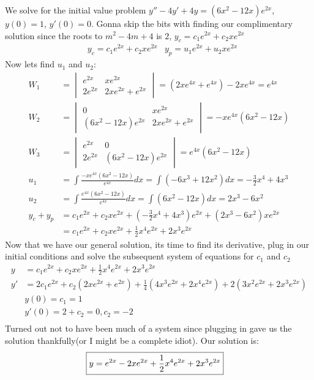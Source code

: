 \documentclass{article}
\begin{document}
\subsubsection{}
We solve for the initial value problem $y'' - 4y' + 4y = (6x^2 - 12x)e^{2x}$, $y(0) = 1$, $y'(0) = 0$.
Gonna skip the bits with finding our complimentary solution since the roots to $m^2 - 4m + 4$ is $ 2 $, $y_c =
c_1e^{2x} + c_2xe^{2x} $
\begin{align*}
    & y_c = c_1e^{2x} + c_2xe^{2x}
    & y_p = u_1e^{2x} + u_2xe^{2x}
\end{align*}
Now lets find $u_1$ and $u_2$:
\begin{align}
    W_1 &= 
    \begin{vmatrix}
        e^{2x} & xe^{2x} \\
        2e^{2x} & 2xe^{2x}+e^{2x} 
    \end{vmatrix} = (2xe^{4x} + e^{4x}) - 2xe^{4x} = e^{4x} \\
    W_2 &= 
    \begin{vmatrix}
        0 & xe^{2x} \\
        (6x^2-12x)e^{2x} & 2xe^{2x} + e^{2x} 
    \end{vmatrix} = -xe^{4x}(6x^2-12x) 
   \\ 
    W_3 &= 
    \begin{vmatrix}
        e^{2x} & 0 \\
        2e^{2x} & (6x^2-12x)e^{2x}  
    \end{vmatrix} = e^{4x}(6x^2 - 12x) \\
    u_1 &= \int\frac{-xe^{4x}(6x^2-12x)}{e^{4x}}dx = \int (-6x^3 + 12x^2)dx = -\frac{3}{2}x^4 + 4x^3 \\
    u_2 &= \int\frac{e^{4x}(6x^2-12x)}{e^{4x}}dx = \int(6x^2 - 12x)dx = 2x^3 - 6x^2 \\
    y_c + y_p &= c_1e^{2x} + c_2xe^{2x} + ( -\frac{3}{2}x^4 + 4x^3)e^{2x} + ( 2x^3 - 6x^2)xe^{2x} \\
    &= c_1e^{2x} + c_2xe^{2x} + \frac{1}{2}x^4e^{2x} + 2x^3e^{2x} 
\end{align}
Now that we have our general solution, its time to find its derivative, plug in our initial conditions and solve the subsequent system of equations for $c_1$ and $c_2$
\begin{align*}
    y &= c_1e^{2x} + c_2xe^{2x} + \frac{1}{2}x^4e^{2x} + 2x^3e^{2x}\\
    y'&= 2c_1e^{2x} + c_2(2xe^{2x} + e^{2x}) + \frac{1}{4}(4x^3e^{2x} + 2x^4e^{2x}) + 2(3x^2e^{2x} + 2x^3e^{2x})\\
    &y(0) = c_1 = 1 \\
    &y'(0) = 2 + c_2 =  0,  c_2 = -2 \\
\end{align*}
Turned out not to have been much of a system since plugging in gave us the solution thankfully(or I might be a complete idiot). Our solution is:
\begin{align*}
    \Aboxed{y = e^{2x} -2xe^{2x} + \frac{1}{2}x^4e^{2x} + 2x^3e^{2x}}
\end{align*}
\end{document}
